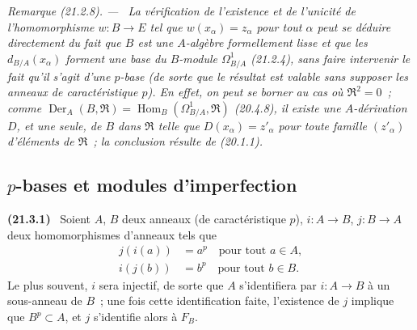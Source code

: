 \documentclass[10pt,oneside]{book}
\makeatletter
\newcommand{\setmanualcurrentlabel}[1]{\def\@currentlabel{#1}}
\newenvironment{env}[1][]{\setmanualcurrentlabel{#1}\par\medskip\noindent\textbf{(#1)}\ }{\par}
\newenvironment{remark}[1][]{%
  \setmanualcurrentlabel{#1}\par\medskip\noindent\itshape Remarque (#1). ---\ }{\par}
\makeatother
\begin{document}
\begin{remark}[21.2.8]
\label{0.21.2.8-fr}
La vérification de l'existence et de l'unicité de l'homomorphisme $w:B\to E$
tel que $w(x_\alpha)=z_\alpha$ pour tout $\alpha$ peut se déduire directement
du fait que $B$ est une $A$-algèbre formellement lisse et que les
$d_{B/A}(x_\alpha)$ forment une base du $B$-module $\Omega^1_{B/A}$ (21.2.4),
sans faire intervenir le fait qu'il s'agit d'une $p$-base (de sorte que le
résultat est valable sans supposer les anneaux de caractéristique $p$).
En effet, on peut se borner au cas où $\mathfrak R^2=0$~; comme
$\operatorname{Der}_A(B,\mathfrak R)=\operatorname{Hom}_B(\Omega^1_{B/A},\mathfrak R)$
(20.4.8), il existe une $A$-dérivation $D$, et une seule, de $B$ dans
$\mathfrak R$ telle que $D(x_\alpha)=z'_\alpha$ pour toute famille
$(z'_\alpha)$ d'éléments de $\mathfrak R$~; la conclusion résulte de (20.1.1).
\end{remark}

\subsection{$p$-bases et modules d'imperfection}
\label{0.21.3-fr}

\begin{env}[21.3.1]
\label{0.21.3.1-fr}
Soient $A$, $B$ deux anneaux (de caractéristique $p$), $i:A\to B$,
$j:B\to A$ deux homomorphismes d'anneaux tels que
\begin{align}
\tag{21.3.1.1}\label{0.21.3.1.1-fr}
j(i(a))&=a^p\quad\text{pour tout }a\in A,\\
\tag{21.3.1.2}\label{0.21.3.1.2-fr}
i(j(b))&=b^p\quad\text{pour tout }b\in B.
\end{align}
Le plus souvent, $i$ sera injectif, de sorte que $A$ s'identifiera par
$i:A\to B$ à un sous-anneau de $B$~; une fois cette identification faite,
l'existence de $j$ implique que $B^p\subset A$, et $j$ s'identifie alors à $F_B$.
\end{env}
\end{document}
